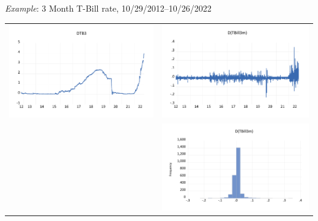 \begin{frame}%
\begin{block}{\emph{Example}: 3 Month T-Bill rate, 10/29/2012--10/26/2022}
\begin{center}
\begin{tabular}{rr}
\includegraphics[height=0.3\textheight]{dtb3}&\includegraphics[height=0.3\textheight]{diffdtb3}\\
&\includegraphics[height=0.3\textheight]{histdtb3}
\end{tabular}
\end{center}
\end{block}
\end{frame}
